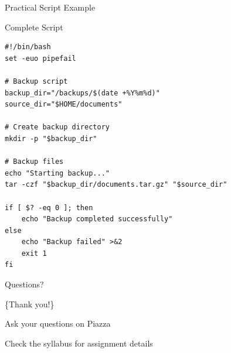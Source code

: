 \documentclass[presentation,aspectratio=1610]{beamer}
\begin{document}
\begin{frame}[label={sec:org93dd4be},fragile]{Practical Script Example}
 \begin{block}{Complete Script}
\begin{verbatim}
#!/bin/bash
set -euo pipefail

# Backup script
backup_dir="/backups/$(date +%Y%m%d)"
source_dir="$HOME/documents"

# Create backup directory
mkdir -p "$backup_dir"

# Backup files
echo "Starting backup..."
tar -czf "$backup_dir/documents.tar.gz" "$source_dir"

if [ $? -eq 0 ]; then
    echo "Backup completed successfully"
else
    echo "Backup failed" >&2
    exit 1
fi
\end{verbatim}
\end{block}
\end{frame}
\begin{frame}[label={sec:orgac1b96b}]{Questions?}
\begin{center}
\{\Large Thank you!\}

\vspace{1em}

Ask your questions on \alert{Piazza}

\vspace{0.5em}

Check the syllabus for assignment details
\end{center}
\end{frame}
\end{document}
